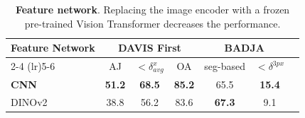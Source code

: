 \begin{table}[t]
\centering
\footnotesize
\caption{  \textbf{Feature network}. Replacing the image encoder with a frozen pre-trained Vision Transformer decreases the performance. }\label{tab:dino_ablation}
\begin{tabular}{ lcccccc }
\toprule
 \multirow{2}{*}{Feature Network}  & \multicolumn{3}{c}{DAVIS First} & \multicolumn{2}{c}{BADJA} \\
\cmidrule(lr){2-4}
\cmidrule(lr){5-6}
             & AJ            & \! \! \! $< \delta^x_{avg}$\! & OA            & \! \! seg-based\! \! & \! \! $< \delta^{3px}$ \! \! \\
\midrule
\textbf{CNN} & \textbf{51.2} & \textbf{68.5}                 & \textbf{85.2} & 65.5                 & \textbf{15.4}                \\
DINOv2       & 38.8          & 56.2                          & 83.6          & \textbf{67.3}        & 9.1                          \\
\bottomrule
\end{tabular}
\end{table}
